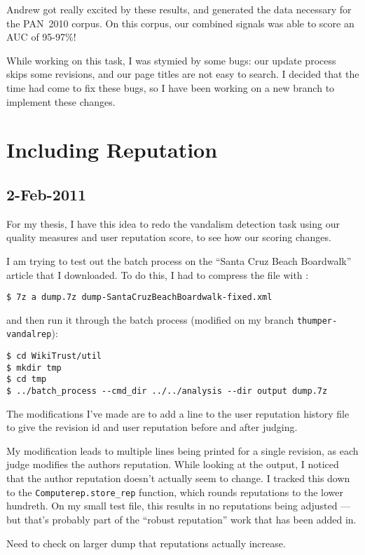 Andrew got really excited by these results, and generated the data
necessary for the PAN~2010 corpus.
On this corpus, our combined signals was able to score an AUC of 95-97\%!

While working on this task, I was stymied by some \wikitrust bugs:
our update process skips some revisions, and our page titles are not
easy to search.
I decided that the time had come to fix these bugs, so I have been
working on a new branch to implement these changes.

\section{Including Reputation}

\subsection{2-Feb-2011}

For my thesis, I have this idea to redo the vandalism detection task
using our quality measures and user reputation score, to see how
our scoring changes.

I am trying to test out the batch process on the
``Santa Cruz Beach Boardwalk'' article that I downloaded.
To do this, I had to compress the file with :
\begin{verbatim}
$ 7z a dump.7z dump-SantaCruzBeachBoardwalk-fixed.xml
\end{verbatim}
and then run it through the batch process (modified on
my branch \texttt{thumper-vandalrep}):
\begin{verbatim}
$ cd WikiTrust/util
$ mkdir tmp
$ cd tmp
$ ../batch_process --cmd_dir ../../analysis --dir output dump.7z
\end{verbatim}
The modifications I've made are to add a line to the
user reputation history file to give the revision id
and user reputation before and after judging.

My modification leads to multiple lines being printed
for a single revision, as each judge modifies the authors reputation.
While looking at the output, I noticed that the author reputation
doesn't actually seem to change.
I tracked this down to the \texttt{Computerep.store\_rep}
function, which rounds reputations to the lower hundreth.
On my small test file, this results in no reputations being
adjusted --- but that's probably part of the ``robust reputation''
work that has been added in.

Need to check on larger dump that reputations actually increase.

